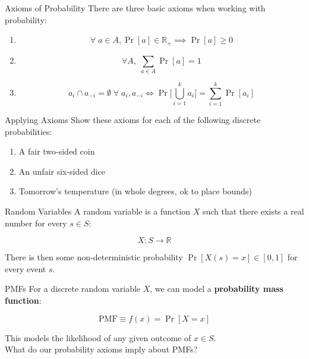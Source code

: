 \documentclass[10pt]{beamer}
\begin{document}
\begin{frame}{Axioms of Probability}
    There are three basic axioms when working with probability:
    \begin{enumerate}
        \item \[\forall\; a \in A, \Pr[a] \in \mathbb{R}_+ \implies \Pr[a] \geq 0\]

        \item \[\forall A,\; \sum_{a \in A} \Pr[a] = 1\]

        \item \[a_i \cap a_{-i} = \emptyset \;\forall \;a_i, a_{-i} \iff \Pr\bigg[ \bigcup_{i=1}^k a_i\bigg] = \sum_{i=1}^k \Pr[a_i]\]
    \end{enumerate}
\end{frame}

\begin{frame}{Applying Axioms}
    Show these axioms for each of the following discrete probabilities:

    \begin{enumerate}
        \item A fair two-sided coin
        \item An unfair six-sided dice
        \item Tomorrow's temperature (in whole degrees, ok to place bounds)
    \end{enumerate}
\end{frame}

\begin{frame}{Random Variables}
    A random variable is a function $X$ such that there exists a real number for every $s \in S$:

    \[X: S \rightarrow \mathbb{R}\]

    There is then some non-deterministic probability $\Pr[X(s) = x] \in [0, 1]$ for every event $s$.
\end{frame}

\begin{frame}{PMFs}
    For a discrete random variable $X$, we can model a \textbf{probability mass function}:

    \[\text{PMF} \equiv f(x) = \Pr[X = x]\]

    This models the likelihood of any given outcome of $x \in S$. \\

    \vspace{.5cm}
    What do our probability axioms imply about PMFs?
\end{frame}
\end{document}
